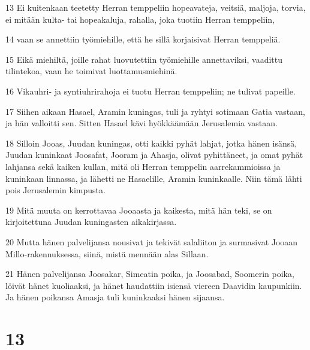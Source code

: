 \par 13 Ei kuitenkaan teetetty Herran temppeliin hopeavateja, veitsiä, maljoja, torvia, ei mitään kulta- tai hopeakaluja, rahalla, joka tuotiin Herran temppeliin,
\par 14 vaan se annettiin työmiehille, että he sillä korjaisivat Herran temppeliä.
\par 15 Eikä miehiltä, joille rahat luovutettiin työmiehille annettaviksi, vaadittu tilintekoa, vaan he toimivat luottamusmiehinä.
\par 16 Vikauhri- ja syntiuhrirahoja ei tuotu Herran temppeliin; ne tulivat papeille.
\par 17 Siihen aikaan Hasael, Aramin kuningas, tuli ja ryhtyi sotimaan Gatia vastaan, ja hän valloitti sen. Sitten Hasael kävi hyökkäämään Jerusalemia vastaan.
\par 18 Silloin Jooas, Juudan kuningas, otti kaikki pyhät lahjat, jotka hänen isänsä, Juudan kuninkaat Joosafat, Jooram ja Ahasja, olivat pyhittäneet, ja omat pyhät lahjansa sekä kaiken kullan, mitä oli Herran temppelin aarrekammioissa ja kuninkaan linnassa, ja lähetti ne Hasaelille, Aramin kuninkaalle. Niin tämä lähti pois Jerusalemin kimpusta.
\par 19 Mitä muuta on kerrottavaa Jooaasta ja kaikesta, mitä hän teki, se on kirjoitettuna Juudan kuningasten aikakirjassa.
\par 20 Mutta hänen palvelijansa nousivat ja tekivät salaliiton ja surmasivat Jooaan Millo-rakennuksessa, siinä, mistä mennään alas Sillaan.
\par 21 Hänen palvelijansa Joosakar, Simeatin poika, ja Joosabad, Soomerin poika, löivät hänet kuoliaaksi, ja hänet haudattiin isiensä viereen Daavidin kaupunkiin. Ja hänen poikansa Amasja tuli kuninkaaksi hänen sijaansa.

\chapter{13}

